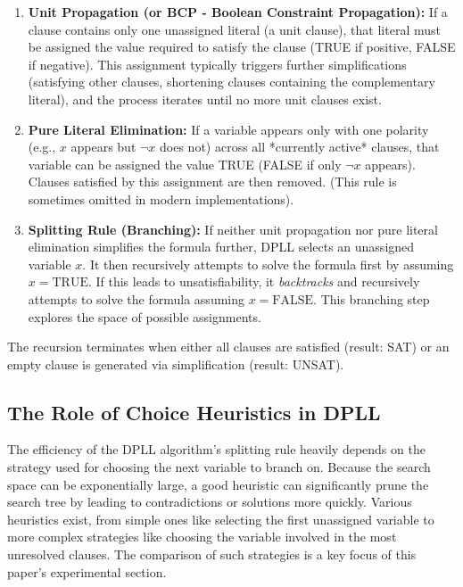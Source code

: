 \documentclass[12pt, a4paper]{article}
\begin{document}
\begin{enumerate}
    \item \textbf{Unit Propagation (or BCP - Boolean Constraint Propagation):} If a clause contains only one unassigned literal (a unit clause), that literal must be assigned the value required to satisfy the clause (TRUE if positive, FALSE if negative). This assignment typically triggers further simplifications (satisfying other clauses, shortening clauses containing the complementary literal), and the process iterates until no more unit clauses exist.
    \item \textbf{Pure Literal Elimination:} If a variable appears only with one polarity (e.g., $x$ appears but $\lnot x$ does not) across all *currently active* clauses, that variable can be assigned the value TRUE (FALSE if only $\lnot x$ appears). Clauses satisfied by this assignment are then removed. (This rule is sometimes omitted in modern implementations).
    \item \textbf{Splitting Rule (Branching):} If neither unit propagation nor pure literal elimination simplifies the formula further, DPLL selects an unassigned variable $x$. It then recursively attempts to solve the formula first by assuming $x = \text{TRUE}$. If this leads to unsatisfiability, it \emph{backtracks} and recursively attempts to solve the formula assuming $x = \text{FALSE}$. This branching step explores the space of possible assignments.
\end{enumerate}
The recursion terminates when either all clauses are satisfied (result: SAT) or an empty clause is generated via simplification (result: UNSAT).

\subsection{The Role of Choice Heuristics in DPLL}
\label{subsec:heuristics_intro}

The efficiency of the DPLL algorithm's splitting rule heavily depends on the strategy used for choosing the next variable to branch on. Because the search space can be exponentially large, a good heuristic can significantly prune the search tree by leading to contradictions or solutions more quickly. Various heuristics exist, from simple ones like selecting the first unassigned variable to more complex strategies like choosing the variable involved in the most unresolved clauses. The comparison of such strategies is a key focus of this paper's experimental section.
\end{document}
